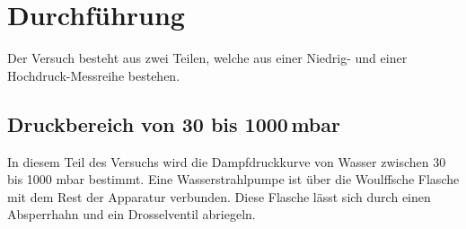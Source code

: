 \section{Durchführung}
\label{sec:Durchführung}

Der Versuch besteht aus zwei Teilen, welche aus einer Niedrig- und einer Hochdruck-Messreihe bestehen.
\subsection{Druckbereich von 30 bis 1000\,mbar}
In diesem Teil des Versuchs wird die Dampfdruckkurve von Wasser zwischen 30 bis 1000 mbar bestimmt.
Eine Wasserstrahlpumpe ist über die Woulffsche Flasche mit dem Rest der Apparatur verbunden.
Diese Flasche lässt sich durch einen Absperrhahn und ein Drosselventil abriegeln.\\ 

